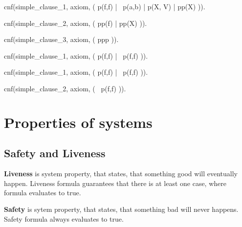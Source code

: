 \begin{tptpcode}
cnf(simple_clause_1, axiom,
    ( p(f,f) | ~p(a,b) | p(X, V) | pp(X) )).

cnf(simple_clause_2, axiom,
    ( pp(f) | pp(X) )).

cnf(simple_clause_3, axiom,
    ( ppp )).

\end{tptpcode}

\begin{tptpcode}
cnf(simple_clause_1, axiom,
    ( p(f,f) | ~p(f,f) )).

\end{tptpcode}

\begin{tptpcode}
cnf(simple_clause_1, axiom,
    ( p(f,f) | ~p(f,f) )).

cnf(simple_clause_2, axiom,
    ( ~p(f,f) )).

\end{tptpcode}

\section{Properties of systems}

\subsection{Safety and Liveness}

\textbf{Liveness} is system property, that states, that something good will eventually happen.
Liveness formula guarantees that there is at least one case, where formula evaluates to true.

\textbf{Safety} is sytem property, that states, that something bad will never happens.
Safety formula always evaluates to true.

